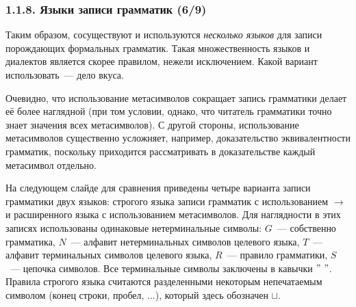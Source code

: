 \begin{frame}
\frametitle{1.1.8. Языки записи грамматик (6/9)}

Таким образом, сосуществуют и используются 
{\em несколько языков} для записи порождающих
формальных грамматик. Такая множественность 
языков и диалектов является скорее правилом,
нежели исключением. Какой вариант использовать~---
дело вкуса. 

\smallskip
Очевидно, что использование метасимволов
сокращает запись грамматики делает её более наглядной
(при том условии, однако, что читатель грамматики
точно знает значения всех метасимволов).
С другой стороны, использование метасимволов
существенно усложняет, например, доказательство
эквивалентности грамматик, поскольку
приходится рассматривать в доказательстве 
каждый метасимвол отдельно. 
 
\begin{example} 
На следующем слайде для сравнения приведены четыре варианта
записи грамматики двух языков:
строгого языка  записи грамматик с использованием $\rightarrow$ и
расширенного языка с использованием метасимволов.
Для наглядности в этих записях использованы
одинаковые нетерминальные символы:
$G$~--- собственно грамматика,
$N$~--- алфавит нетерминальных символов целевого языка,
$T$~--- алфавит терминальных символов целевого языка,
$R$~--- правило грамматики,
$S$~--- цепочка символов.
Все терминальные символы заключены в кавычки $"\ "$.
Правила строгого языка считаются разделенными
некоторым непечатаемым символом (конец строки, пробел, ...),
который здесь обозначен $\sqcup$.
\end{example}

 


\end{frame}

